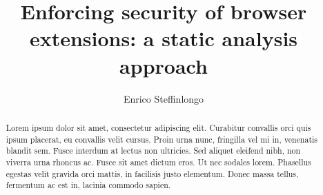 \documentclass[10pt]{llncs}
\author{Enrico Steffinlongo}
\title{Enforcing security of browser extensions: a static analysis approach}
\begin{document}
\maketitle

\begin{abstract}
Lorem ipsum dolor sit amet, consectetur adipiscing elit. Curabitur convallis orci quis ipsum placerat, eu convallis velit cursus. Proin urna nunc, fringilla vel mi in, venenatis blandit sem. Fusce interdum at lectus non ultricies. Sed aliquet eleifend nibh, non viverra urna rhoncus ac. Fusce sit amet dictum eros. Ut nec sodales lorem. Phasellus egestas velit gravida orci mattis, in facilisis justo elementum. Donec massa tellus, fermentum ac est in, lacinia commodo sapien.
\end{abstract}







\end{document}
